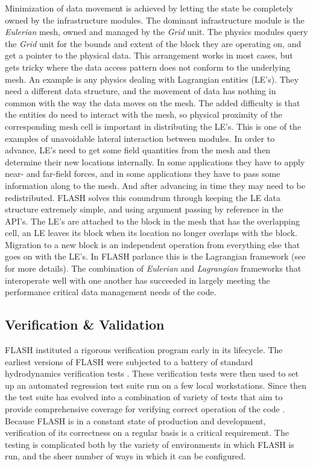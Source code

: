 Minimization of data movement is achieved by letting the state be
completely owned by the infrastructure modules. The dominant
infrastructure module is the {\em Eulerian} mesh, owned and managed by
the {\em Grid} unit. The physics modules query the {\em Grid} unit
for the bounds and extent of the block they are operating on, and
get a pointer to the physical data. This arrangement works in most
cases, but gets tricky where  the data access pattern does not conform
to the underlying mesh. An example is any physics dealing with
Lagrangian entities (LE's). They need a different data structure, and
the movement of data has nothing in common with the way the data moves
on the mesh. The added difficulty is that the entities do need to
interact with the mesh, so physical proximity of the corresponding
mesh cell is important in distributing the LE's. This is one of the
examples of unavoidable lateral interaction between modules. In order
to advance, LE's need to get some field quantities from the mesh and
then determine their new locations internally. In some applications
they have to apply near- and far-field forces, and in some
applications they have to pass some information along to the mesh. And
after advancing in time they may need to be redistributed. FLASH solves
this conundrum through keeping the LE data structure extremely simple,
and using argument passing by reference in the API's. The LE's are
attached to the block in the mesh that has the overlapping cell, an LE
leaves its block when its location no longer overlaps with the
block. Migration to a new block is an independent operation from
everything else that goes on with the LE's. In FLASH parlance this is
the Lagrangian framework (see \cite{Dubey2012} for more details). The
combination of {\em Eulerian} and {\em Lagrangian} frameworks that
interoperate well with one another has succeeded in largely meeting the
performance critical data management needs of the code. 

\subsection{Verification \& Validation}
\label{sec:FLASHvandv}

FLASH instituted a rigorous verification program early in its
lifecycle. The earliest versions of FLASH were subjected to
a battery of standard hydrodynamics verification tests
\cite{Fryxell2000}. These verification tests were then used to set up
an automated regression test suite run on a few local
workstations. Since then the test suite has evolved into a
combination of variety of tests that aim to provide comprehensive
coverage for verifying correct operation of the code
\cite{Dubey2013,Calder2005}. Because FLASH is in a constant state of
production and 
development, verification of its correctness on a regular basis is a
critical requirement.  The testing is complicated both by the variety 
of environments in which FLASH is run, and the sheer number of ways in
which it can be configured. 

